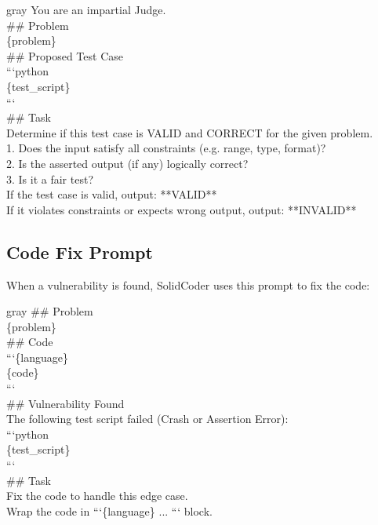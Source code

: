 \documentclass[11pt]{article}
\begin{document}
\begin{promptbox}[title={\textcolor{white}{Judge Prompt}}, colframe=gray!70!black, colback=gray!5!white, boxed title style={colback=gray!70!black}]{gray}
\small\ttfamily
You are an impartial Judge.\\[0.5em]
\#\# Problem\\
\{problem\}\\[0.5em]
\#\# Proposed Test Case\\
```python\\
\{test\_script\}\\
```\\[0.5em]
\#\# Task\\
Determine if this test case is VALID and CORRECT for the given problem.\\
1. Does the input satisfy all constraints (e.g. range, type, format)?\\
2. Is the asserted output (if any) logically correct?\\
3. Is it a fair test?\\[0.5em]
If the test case is valid, output: **VALID**\\
If it violates constraints or expects wrong output, output: **INVALID**
\end{promptbox}

\subsection{Code Fix Prompt}

When a vulnerability is found, SolidCoder uses this prompt to fix the code:

\begin{promptbox}[title={\textcolor{white}{Code Fix Prompt}}, colframe=gray!70!black, colback=gray!5!white, boxed title style={colback=gray!70!black}]{gray}
\small\ttfamily
\#\# Problem\\
\{problem\}\\[0.5em]
\#\# Code\\
```\{language\}\\
\{code\}\\
```\\[0.5em]
\#\# Vulnerability Found\\
The following test script failed (Crash or Assertion Error):\\
```python\\
\{test\_script\}\\
```\\[0.5em]
\#\# Task\\
Fix the code to handle this edge case.\\
Wrap the code in ```\{language\} ... ``` block.
\end{promptbox}
\end{document}
